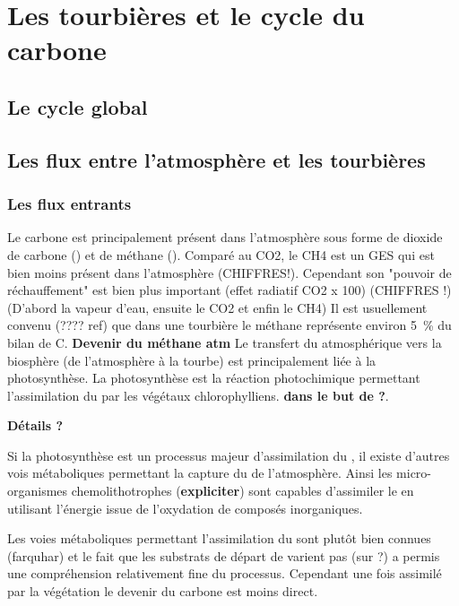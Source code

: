 \section{Les tourbières et le cycle du carbone}

\subsection{Le cycle global}

\subsection{Les flux entre l'atmosphère et les tourbières}

\subsubsection{Les flux entrants}

Le carbone est principalement présent dans l'atmosphère sous forme de dioxide de carbone (\COO) et de méthane (\CHH).
Comparé au CO2, le CH4 est un GES qui est bien moins présent dans l'atmosphère (CHIFFRES!).
Cependant son "pouvoir de réchauffement" est bien plus important (effet radiatif CO2 x 100) (CHIFFRES !) (D'abord la vapeur d'eau, ensuite le CO2 et enfin le CH4)
Il est usuellement convenu (???? ref) que dans une tourbière le méthane représente environ \SI{5}{\percent} du bilan de C.
\textbf{Devenir du méthane atm}
Le transfert du \COO atmosphérique vers la biosphère (de l'atmosphère à la tourbe) est principalement \plop liée à la photosynthèse.
La photosynthèse est la réaction photochimique permettant l'assimilation du \COO par les végétaux chlorophylliens.
\textbf{dans le but de ?}.

\textbf{Détails ?}

Si la photosynthèse est un processus majeur d'assimilation du \COO, il existe d'autres vois métaboliques permettant la capture du \COO de l'atmosphère.
Ainsi les micro-organismes chemolithotrophes (\textbf{expliciter}) sont capables d'assimiler le \COO en utilisant l'énergie issue de l'oxydation de composés inorganiques.

Les voies métaboliques permettant l'assimilation du \COO sont plutôt bien connues (farquhar) et le fait que les substrats de départ de varient pas (sur ?) a permis une compréhension relativement fine du processus.
Cependant une fois assimilé par la végétation le devenir du carbone est moins direct.

